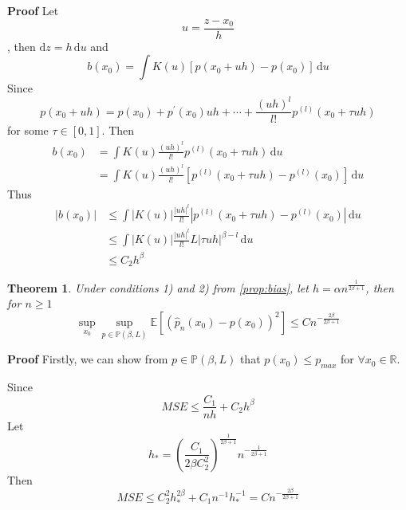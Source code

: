 \documentclass[10pt]{article}
\newcounter{lecnum}
\newtheorem{theorem}{Theorem}[lecnum]
\newcommand{\Expect}[1]{\mathbb{E}\!\left[#1\right]}
\newcommand{\R}{\mathbb{R}}
\renewcommand{\hat}{\widehat}
\begin{document}
\textbf{Proof}
Let 
\begin{equation}
u=\frac{z-x_0}{h}
\end{equation}
, then $\mathrm{d}z = h \, \mathrm{d}u$ and
\begin{equation}
b(x_0) = \int K(u) [p(x_0 + uh) -p(x_0)] \, \mathrm{d}u
\end{equation}
Since
\begin{equation}
p(x_0 + uh) = p(x_0) + p^{\prime}(x_0) uh + \cdots + \frac{(uh)^l}{l !} p^{(l)} (x_0 + \tau uh)
\end{equation}
for some $\tau \in [0, 1]$. Then
\begin{align}
b(x_0) &= \int K(u) \frac{(uh)^l}{l !} p^{(l)} (x_0 + \tau uh) \, \mathrm{d}u \\
&= \int K(u) \frac{(uh)^l}{l !} [p^{(l)} (x_0 + \tau uh) - p^{(l)} (x_0)]\, \mathrm{d}u
\end{align}
Thus
\begin{align}
|b(x_0)| &\le \int |K(u)| \frac{|uh|^l}{l !} |p^{(l)} (x_0 + \tau uh) - p^{(l)} (x_0)| \, \mathrm{d}u \\
& \le \int |K(u)| \frac{|uh|^l}{l !} L |\tau uh|^{\beta - l} \, \mathrm{d}u \\
& \le C_2 h^\beta
\end{align}

\begin{theorem}
Under conditions 1) and 2) from \autoref{prop:bias}, let $h = \alpha n^{\frac{1}{2\beta + 1}}$,
then for $n \ge 1$
\begin{equation}
\sup_{x_0} \sup_{p \in \mathbb{P}(\beta, L)} \Expect{(\hat{p}_n(x_0) - p(x_0))^2} \le C n^{- \frac{2\beta}{2\beta+1}}
\end{equation}
\end{theorem}

\textbf{Proof} 
Firstly, we can show from  $p \in \mathbb{P}(\beta, L)$ that $p(x_0) \le p_{max}$ for $\forall x_0 \in \R$.

Since
\begin{equation}
MSE \le \frac{C_1}{nh} + C_2h^\beta
\end{equation}
Let
\begin{equation}
h_{*} = (\frac{C_1}{2\beta C_2^2})^{\frac{1}{2\beta+1}} n^{- \frac{1}{2\beta+1}}
\end{equation}
Then
\begin{equation}
MSE \le C_2^2 h_{*}^{2\beta} + C_1 n^{-1} h_{*}^{-1} = C n^{- \frac{2\beta}{2\beta+1}}
\end{equation}








%
%
\end{document}
